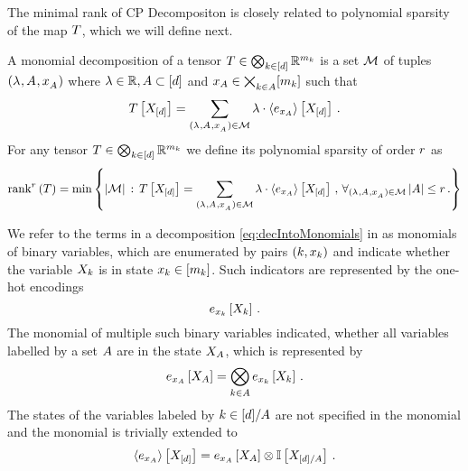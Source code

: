 The minimal rank of CP Decompositon is closely related to polynomial sparsity of the map $T$, which we will define next.

\begin{definition}\label{def:polynomialSparsity}
	A monomial decomposition of a tensor $T\in\bigotimes_{k\in[d]} \mathbb{R}^{m_{k}}$ is a set $\mathcal{M}$ of tuples $(\lambda^{}, A^{}, x_{A^{}}^{})$ where $\lambda\in\mathbb{R}, A\subset[d]$ and $x_{A}\in\bigtimes_{k\in A} [m_{k}]$ such that
	\begin{align}\label{eq:decIntoMonomials}
		T\left[X_{[d]}\right] = \sum_{(\lambda^{}, A^{}, x_{A^{}}^{})\in\mathcal{M}} \lambda \cdot \left\langle e_{x_{A}}\right\rangle \left[ X_{[d]} \right] \, .
	\end{align}
	For any tensor $T\in\bigotimes_{k\in[d]} \mathbb{R}^{m_{k}}$ we define its polynomial sparsity of order $r$ as
	\begin{align*}
		\mathrm{rank}^{r}\left(T\right) =
		 \min \left\{ \left|\mathcal{M}\right| \, : \, 
		 	T\left[X_{[d]}\right] = \sum_{(\lambda^{}, A^{}, x_{A^{}}^{})\in\mathcal{M}} \lambda \cdot \left\langle e_{x_{A}}\right\rangle \left[ X_{[d]} \right] \, , \, \forall_{(\lambda^{}, A^{}, x_{A^{}}^{})\in\mathcal{M}} \left|A\right| \leq r \, . 
		 \right\}
	\end{align*}
\end{definition}


We refer to the terms in a decomposition \eqref{eq:decIntoMonomials} in  as monomials of binary variables, which are enumerated by pairs $(k,x_{k})$ and indicate whether the variable $X_{k}$ is in state $x_{k}\in[m_{k}]$.
Such indicators are represented by the one-hot encodings
	\[ e_{x_{k}}\left[X_{k}\right] \, . \]
The monomial of multiple such binary variables indicated, whether all variables labelled by a set $A$ are in the state $X_{A}$, which is represented by
	\[ e_{x_{A}}\left[X_{A}\right] = \bigotimes_{k\in A} e_{x_{k}}\left[X_{k}\right]  \, . \]
The states of the variables labeled by $k\in[d]/A$ are not specified in the monomial and the monomial is trivially extended to
	\[ \left\langle e_{x_{A}}\right\rangle \left[ X_{[d]} \right]  = e_{x_{A}}\left[X_{A}\right] \otimes \mathbb{I}\left[X_{[d]/A}\right] \, .   \]


